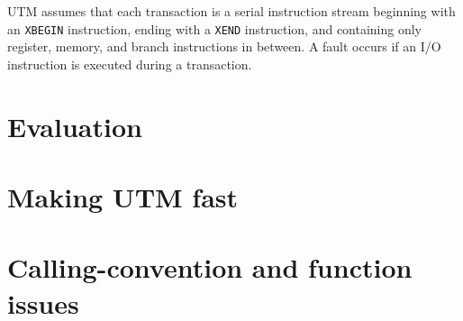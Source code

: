 UTM assumes that each transaction is a serial instruction stream
beginning with an \texttt{XBEGIN} instruction, ending with a
\texttt{XEND} instruction, and containing only register, memory, and
branch instructions in between.  A fault occurs if an I/O instruction
is executed during a transaction.





\section{Evaluation}

\section{Making UTM fast}

\section{Calling-convention and function issues}

